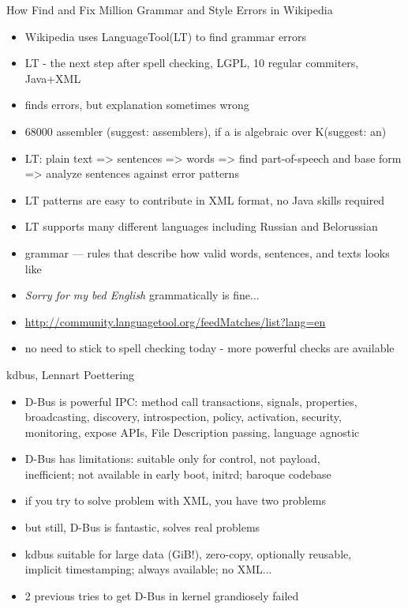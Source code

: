 \documentclass[aspectratio=169]{beamer}
\begin{document}
\begin{frame}{How Find and Fix Million Grammar and Style Errors in Wikipedia}
  \begin{itemize}
  \item Wikipedia uses LanguageTool(LT) to find grammar errors
  \item LT - the next step after spell checking, LGPL, 10 regular commiters, Java+XML
  \item finds errors, but explanation sometimes wrong
  \item 68000 assembler (suggest: assemblers), if a is algebraic over K(suggest: an)
  \item LT: plain text => sentences => words => find part-of-speech and base form \\=> analyze sentences against error patterns
  \item LT patterns are easy to contribute in XML format, no Java skills required
  \item LT supports many different languages including Russian and Belorussian
  \item grammar --- rules that describe how valid words, sentences, and texts looks like
  \item {\it Sorry for my bed English} grammatically is fine...
  \item \url{http://community.languagetool.org/feedMatches/list?lang=en}
  \item no need to stick to spell checking today - more powerful checks are available
  \end{itemize}
\end{frame}

\begin{frame}{kdbus, Lennart Poettering}
  \begin{itemize}
  \item D-Bus is powerful IPC: method call transactions, signals, properties,
        \\broadcasting, discovery, introspection, policy, activation, security,
        \\monitoring, expose APIs, File Description passing, language agnostic
  \item D-Bus has limitations: suitable only for control, not payload,
        \\inefficient; not available in early boot, initrd; baroque codebase
  \item if you try to solve problem with XML, you have two problems
  \item but still, D-Bus is fantastic, solves real problems
  \item kdbus suitable for large data (GiB!), zero-copy, optionally reusable,
        \\implicit timestamping; always available; no XML...
  \item 2 previous tries to get D-Bus in kernel grandiosely failed
  \end{itemize}
\end{frame}
 
\end{document}
